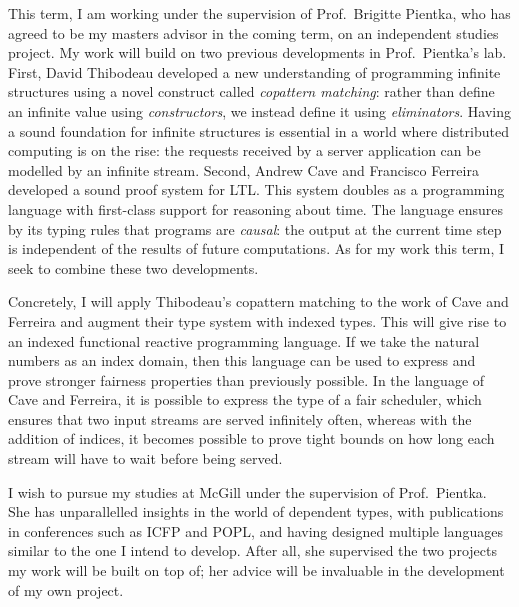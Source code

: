 \documentclass[11pt,letterpaper]{article}
\begin{document}
This term, I am working under the supervision of Prof.~Brigitte Pientka, who
has agreed to be my masters advisor in the coming term, on an independent
studies project. My work will build on two previous developments in
Prof.~Pientka's lab.
First, David Thibodeau developed a new understanding of programming infinite
structures using a novel construct called \emph{copattern matching}: rather
than define an infinite value using \emph{constructors}, we instead define it
using \emph{eliminators}\footnotemark.
%
%
%
Having a sound foundation for infinite structures is essential in a world where
distributed computing is on the rise: the requests received by a server
application can be modelled by an infinite stream.
%
Second, Andrew Cave and Francisco Ferreira developed a sound proof system for
LTL\footnotemark.
This system doubles as a programming language with first-class support for
reasoning about time.
The language ensures by its typing rules that programs are \emph{causal}: the
output at the current time step is independent of the results of future
computations.
%
%
%
As for my work this term, I seek to combine these two developments.

Concretely, I will apply Thibodeau's copattern matching to the work of Cave and
Ferreira and augment their type system with indexed types.
This will give rise to an indexed functional reactive programming language.
If we take the natural numbers as an index domain, then this language can be
used to express and prove stronger fairness properties than previously
possible. In the language of Cave and Ferreira, it is possible to express the
type of a fair scheduler, which ensures that two input streams are served
infinitely often, whereas with the addition of indices, it becomes possible to
prove tight bounds on how long each stream will have to wait before being
served.

I wish to pursue my studies at McGill under the supervision of Prof.~Pientka.
She has unparallelled insights in the world of dependent types, with
publications in conferences such as ICFP and POPL, and having designed multiple
languages similar to the one I intend to develop. After all, she supervised the
two projects my work will be built on top of; her advice will be
invaluable in the development of my own project.
\end{document}
